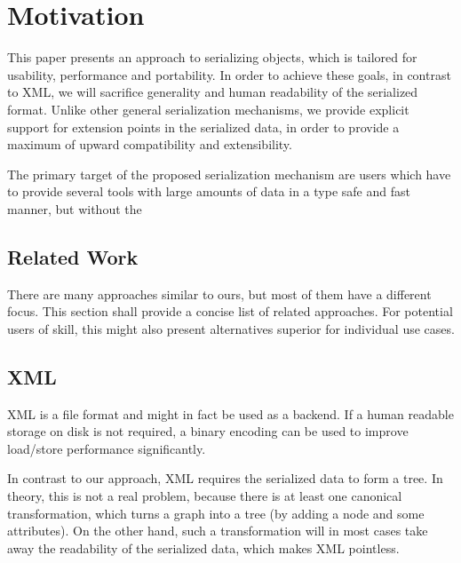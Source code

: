 \section{Motivation}

This paper presents an approach to serializing objects, which is tailored for usability, performance and portability. In order to achieve these goals, in contrast to XML, we will sacrifice generality and human readability of the serialized format. Unlike other general serialization mechanisms, we provide explicit support for extension points in the serialized data, in order to provide a maximum of upward compatibility and extensibility.

The primary target of the proposed serialization mechanism are users which have to provide several tools with large amounts of data in a type safe and fast manner, but without the 

\subsection{Related Work}

There are many approaches similar to ours, but most of them have a different focus. This section shall provide a concise list of related approaches. For potential users of skill, this might also present alternatives superior for individual use cases.

\subsection*{XML}

XML is a file format and might in fact be used as a backend. If a human readable storage on disk is not required, a binary encoding can be used to improve load/store performance significantly.

In contrast to our approach, XML requires the serialized data to form a tree. In theory, this is not a real problem, because there is at least one canonical transformation, which turns a graph into a tree (by adding a node and some attributes). On the other hand, such a transformation will in most cases take away the readability of the serialized data, which makes XML pointless.

